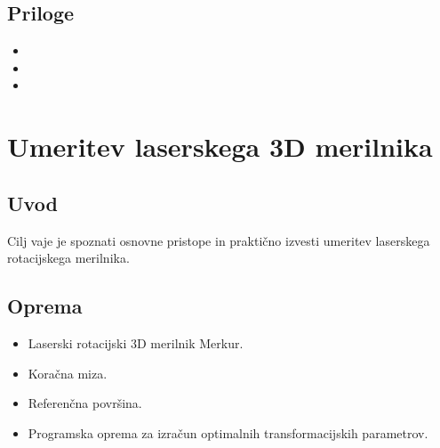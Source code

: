 \documentclass[letterpaper,10pt,english]{sphinxmanual}
\begin{document}
\section{Priloge}
\label{\detokenize{laserskiprofilomer:priloge}}\begin{itemize}
\item {} 
\sphinxAtStartPar
{}

\item {} 
\sphinxAtStartPar
{}

\item {} 
\sphinxAtStartPar
{}

\end{itemize}


\chapter{Umeritev laserskega 3D merilnika}
\label{\detokenize{kalibracija:umeritev-laserskega-3d-merilnika}}\label{\detokenize{kalibracija:kalibracija}}\label{\detokenize{kalibracija::doc}}

\section{Uvod}
\label{\detokenize{kalibracija:uvod}}
\sphinxAtStartPar
Cilj vaje je spoznati osnovne pristope in praktično izvesti umeritev laserskega rotacijskega merilnika.


\section{Oprema}
\label{\detokenize{kalibracija:oprema}}\begin{itemize}
\item {} 
\sphinxAtStartPar
Laserski rotacijski 3D merilnik \textendash{} Merkur.

\item {} 
\sphinxAtStartPar
Koračna miza.

\item {} 
\sphinxAtStartPar
Referenčna površina.

\item {} 
\sphinxAtStartPar
Programska oprema za izračun optimalnih transformacijskih parametrov.

\end{itemize}
\end{document}
